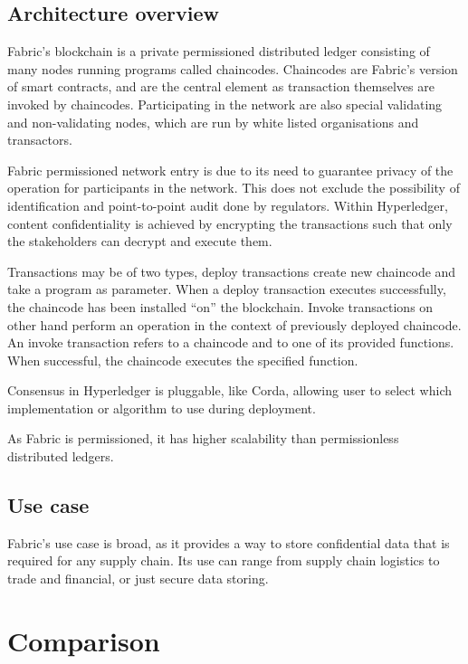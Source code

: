 \subsection{Architecture overview}

Fabric's blockchain is a private permissioned distributed ledger consisting of many nodes running programs called chaincodes. Chaincodes are Fabric's version of smart contracts, and are the central element as transaction themselves are invoked by chaincodes. Participating in the network are also special validating and non-validating nodes, which are run by white listed organisations and transactors. 

Fabric permissioned network entry is due to its need to guarantee privacy of the operation for participants in the network. This does not exclude the possibility of identification and point-to-point audit done by regulators. Within Hyperledger, content confidentiality is achieved by encrypting the transactions such that only the stakeholders can decrypt and execute them.

Transactions may be of two types, deploy transactions create new chaincode and take a program as parameter. When a deploy transaction executes successfully, the chaincode has been installed “on” the blockchain. Invoke transactions on other hand perform an operation in the context of previously deployed chaincode. An invoke transaction refers to a chaincode and to one of its provided functions. When successful, the chaincode executes the specified function.

Consensus in Hyperledger is pluggable, like Corda, allowing user to select which implementation or algorithm to use during deployment. 

As Fabric is permissioned, it has higher scalability than permissionless distributed ledgers.

\subsection{Use case}

Fabric's use case is broad, as it provides a way to store confidential data that is required for any supply chain. Its use can range from supply chain logistics to trade and financial, or just secure data storing.

\section{Comparison}

